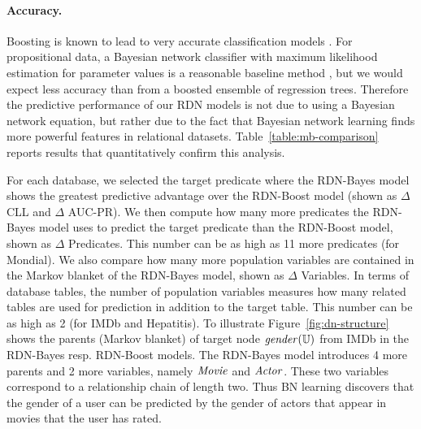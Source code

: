 \documentclass[runningheads,a4paper]{llncs}
\begin{document}
\paragraph{Accuracy.} Boosting is known to lead to very accurate classification models \cite{Bishop2006}. For propositional data, a Bayesian network classifier with maximum likelihood estimation for parameter values is a reasonable baseline method \cite{Grossman2004}, but we would expect less accuracy than from a boosted ensemble of regression trees. Therefore the predictive performance of our RDN models is not due to using a Bayesian network equation, but rather due to the fact that Bayesian network learning finds more powerful features in relational datasets. Table~\ref{table:mb-comparison} reports results that quantitatively confirm this analysis. 

For each database, we selected the target predicate where the RDN-Bayes model shows the greatest predictive advantage over the RDN-Boost model (shown as $\Delta$ CLL and $\Delta$ AUC-PR). We then compute how many more predicates the RDN-Bayes model uses to predict the target predicate than the RDN-Boost model, shown as $\Delta$ Predicates. This number can be as high as 11 more predicates (for Mondial). We also compare how many more population variables are contained in the Markov blanket of the RDN-Bayes model, shown as $\Delta$ Variables. In terms of database tables, the number of population variables measures how many related tables are used for prediction in addition to the target table. This number can be as high as 2 (for IMDb and Hepatitis). To illustrate Figure~\ref{fig:dn-structure} shows the parents (Markov blanket) of target node $\it{gender}(\mathbb{U})$ from IMDb in the RDN-Bayes resp. RDN-Boost models. The RDN-Bayes model introduces 4 more parents and 2 more variables, namely $\it{Movie}$ and $\it{Actor}$. These two variables correspond to a relationship chain of length two. Thus BN learning discovers that the gender of a user can be predicted by the gender of actors that appear in movies that the user has rated.
\end{document}

